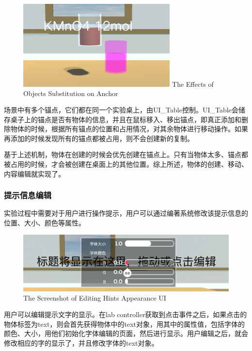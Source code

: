 \begin{figure}[!htp]
  \centering
  \includegraphics[width=8cm]{figure/substi.png}
    {The Effects of Objects Substitution on Anchor}
 \label{fig:substi}
\end{figure}

场景中有多个锚点，它们都在同一个实验桌上，由UI\_Table控制。UI\_Table会储存桌子上的锚点是否有物体的信息，并且在鼠标移入、移出锚点，即真正添加和删除物体的时候，根据所有锚点的位置和占用情况，对其余物体进行移动操作。如果再添加的时候发现所有的锚点都被占用，则不会创建新的复制。

基于上述机制，物体在创建的时候会优先创建在锚点上。只有当物体太多、锚点都被占用的时候，才会被创建在桌面上的其他位置。综上所述，物体的创建、移动、内容编辑就实现了。


\subsubsection{提示信息编辑}
实验过程中需要对于用户进行操作提示，用户可以通过编著系统修改该提示信息的位置、大小、颜色等属性。

\begin{figure}[!htp]
  \centering
  \includegraphics[width=12cm]{figure/text.png}
    {The Screenshot of Editing Hints Appearance  UI}
 \label{fig:gm}
\end{figure}

用户可以编辑提示文字的显示。在lab controller获取到点击事件之后，如果点击的物体标签为text，则会首先获得物体中的text对象，用其中的属性值，包括字体的颜色、大小，用他们初始化字体编辑的页面，然后进行显示。用户编辑之后，就会修改相应的字的显示了，并且修改字体的text对象。

